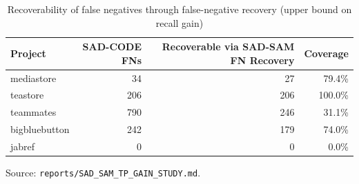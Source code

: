 \begin{table}[htbp]
  \centering
  \caption{Recoverability of \sadcode false negatives through \sadsam false-negative recovery (upper bound on recall gain)}
  \label{tab:sadsam-coverage}
  \begin{tabular}{lrrr}
    \toprule
    Project & SAD-CODE FNs & Recoverable via SAD-SAM FN Recovery & Coverage \\
    \midrule
    mediastore & 34 & 27 & 79.4\% \\
    teastore & 206 & 206 & 100.0\% \\
    teammates & 790 & 246 & 31.1\% \\
    bigbluebutton & 242 & 179 & 74.0\% \\
    jabref & 0 & 0 & 0.0\% \\
    \bottomrule
  \end{tabular}
  \par\smallskip\footnotesize Source: \texttt{reports/SAD\_SAM\_TP\_GAIN\_STUDY.md}.
\end{table}

